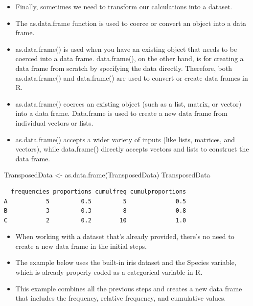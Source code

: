 \documentclass[
  letterpaper,
  DIV=11,
  numbers=noendperiod]{scrreprt}
\newenvironment{Shaded}{\begin{snugshade}}{\end{snugshade}}
\newcommand{\FunctionTok}[1]{\textcolor[rgb]{0.28,0.35,0.67}{#1}}
\newcommand{\NormalTok}[1]{\textcolor[rgb]{0.00,0.23,0.31}{#1}}
\newcommand{\OtherTok}[1]{\textcolor[rgb]{0.00,0.23,0.31}{#1}}
\providecommand{\tightlist}{%
  \setlength{\itemsep}{0pt}\setlength{\parskip}{0pt}}\usepackage{longtable,booktabs,array}
\begin{document}
\begin{itemize}
\tightlist
\item
  Finally, sometimes we need to transform our calculations into a
  dataset.
\item
  The as.data.frame function is used to coerce or convert an object into
  a data frame.
\item
  as.data.frame() is used when you have an existing object that needs to
  be coerced into a data frame. data.frame(), on the other hand, is for
  creating a data frame from scratch by specifying the data directly.
  Therefore, both as.data.frame() and data.frame() are used to convert
  or create data frames in R.
\item
  as.data.frame() coerces an existing object (such as a list, matrix, or
  vector) into a data frame. Data.frame is used to create a new data
  frame from individual vectors or lists.
\item
  as.data.frame() accepts a wider variety of inputs (like lists,
  matrices, and vectors), while data.frame() directly accepts vectors
  and lists to construct the data frame.
\end{itemize}

\begin{Shaded}
\begin{Highlighting}[]
\NormalTok{TransposedData }\OtherTok{\textless{}{-}} \FunctionTok{as.data.frame}\NormalTok{(TransposedData)}
\NormalTok{TransposedData}
\end{Highlighting}
\end{Shaded}

\begin{verbatim}
  frequencies proportions cumulfreq cumulproportions
A           5         0.5         5              0.5
B           3         0.3         8              0.8
C           2         0.2        10              1.0
\end{verbatim}

\begin{itemize}
\item
  When working with a dataset that's already provided, there's no need
  to create a new data frame in the initial steps.
\item
  The example below uses the built-in iris dataset and the Species
  variable, which is already properly coded as a categorical variable in
  R.
\item
  This example combines all the previous steps and creates a new data
  frame that includes the frequency, relative frequency, and cumulative
  values.
\end{itemize}
\end{document}
